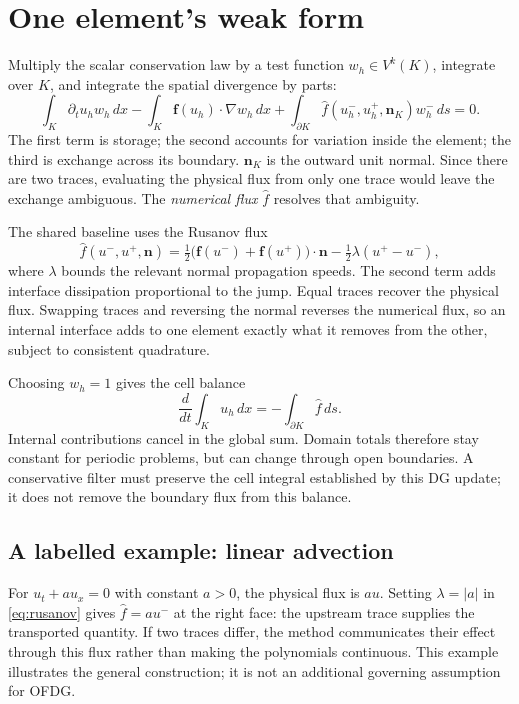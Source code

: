 \section{One element's weak form}
Multiply the scalar conservation law by a test function $w_h\in V^k(K)$,
integrate over $K$, and integrate the spatial divergence by parts:
\begin{equation}
 \int_K\partial_tu_h w_h\,dx
 -\int_K\boldsymbol f(u_h)\cdot\nabla w_h\,dx
 +\int_{\partial K}\widehat f(u_h^-,u_h^+,\boldsymbol n_K)w_h^-\,ds=0.
 \label{eq:rkdg-weak-form}
\end{equation}
The first term is storage; the second accounts for variation inside the element;
the third is exchange across its boundary. $\boldsymbol n_K$ is the outward
unit normal. Since there are two traces, evaluating the physical flux from
only one trace would leave the exchange ambiguous. The \emph{numerical flux}
$\widehat f$ resolves that ambiguity.

The shared baseline uses the Rusanov flux
\begin{equation}
 \widehat f(u^-,u^+,\boldsymbol n)
 =\tfrac12\bigl(\boldsymbol f(u^-)+\boldsymbol f(u^+)\bigr)\cdot\boldsymbol n
   -\tfrac12\lambda(u^+-u^-),
 \label{eq:rusanov}
\end{equation}
where $\lambda$ bounds the relevant normal propagation speeds. The second term
adds interface dissipation proportional to the jump. Equal traces recover the
physical flux. Swapping traces and reversing the normal reverses the numerical
flux, so an internal interface adds to one element exactly what it removes
from the other, subject to consistent quadrature.

Choosing $w_h=1$ gives the cell balance
\begin{equation}
 \frac{d}{dt}\int_K u_h\,dx
 =-\int_{\partial K}\widehat f\,ds.
 \label{eq:cell-balance}
\end{equation}
Internal contributions cancel in the global sum. Domain totals therefore stay
constant for periodic problems, but can change through open boundaries.
A conservative filter must preserve the cell integral established by this DG
update; it does not remove the boundary flux from this balance.

\subsection{A labelled example: linear advection}
For $u_t+a u_x=0$ with constant $a>0$, the physical flux is $au$. Setting
$\lambda=|a|$ in \cref{eq:rusanov} gives $\widehat f=a u^-$ at the right face:
the upstream trace supplies the transported quantity. If two traces differ,
the method communicates their effect through this flux rather than making the
polynomials continuous. This example illustrates the general construction;
it is not an additional governing assumption for OFDG.

